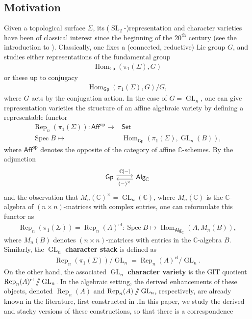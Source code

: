 \documentclass{article}
\numberwithin{equation}{section}
\theoremstyle{quest}
\theoremstyle{definition}
\theoremstyle{remark}
\DeclareMathOperator{\GL}{GL}
\DeclareMathOperator{\Hom}{Hom}
\DeclareMathOperator{\Spec}{Spec}
\DeclareMathOperator{\SL}{SL}
\DeclareMathOperator{\Rep}{Rep}
\newcommand{\git}{\mathbin{
  \mathchoice{/\mkern-6mu/}%
    {/\mkern-6mu/}%
    {/\mkern-5mu/}%
    {/\mkern-5mu/}}}%
\begin{document}
\subsection{Motivation}
Given a topological surface $\Sigma$, its ($\SL_2$-)representation and character varieties have been of classical interest since the beginning of the $20^{\text{th}}$ century (see the introduction to \cite{goldman-char-variety-history}). Classically, one fixes a (connected, reductive) Lie group $G$, and studies either representations of the fundamental group
\begin{align*}
	\Hom_{\mathsf{Gp}}(\pi_1(\Sigma),G)
\end{align*} 
or these up to conjugacy
\begin{align*}
	\Hom_{\mathsf{Gp}}(\pi_1(\Sigma),G) /G,
\end{align*} 
where $G$ acts by the conjugation action. In the case of $G=\GL_n$, one can give representation varieties the structure of an affine algebraic variety by defining a representable functor \cite[Proposition 1.2]{lub}
\begin{align*}
	\Rep_n(\pi_1(\Sigma)): \mathsf{Aff}^{\text{op}}\to &\mathsf{Set}\\
	\Spec B\mapsto &\Hom_{\mathsf{Gp}}(\pi_1(\Sigma),\GL_n(B)),
\end{align*} 
where $\mathsf{Aff}^{\text{op}}$ denotes the opposite of the category of affine $\mathbb{C} $-schemes. By the adjunction
\[
\begin{tikzcd}
\mathsf{Gp}\arrow[r,shift left,"{\mathbb{C}[-]} "]&\mathsf{Alg}_{\mathbb{C} }\arrow[l,shift left, "(-)^\times"]
\end{tikzcd}
\] 
and the observation that $M_n(\mathbb{C} )^\times=\GL_n(\mathbb{C} )$, where $M_n(\mathbb{C} )$ is the $\mathbb{C} $-algebra of $(n\times n)$-matrices with complex entries, one can reformulate this functor as
\begin{align*}
	\Rep_n(\pi_1(\Sigma))=\Rep_n(A)^{\text{cl}}:\Spec B\mapsto \Hom_{\mathsf{Alg}_{\mathbb{C} }}(A,M_n(B )),
\end{align*} 
where $M_n(B)$ denotes $(n\times n)$-matrices with entries in the $\mathbb{C} $-algebra $B$. Similarly, the $\GL_n$ \textbf{character stack} is defined as
\begin{align*}
	\Rep_n(\pi_1(\Sigma)) /\GL_n = \Rep_n(A) ^{\text{cl}}/\GL_n.
\end{align*} 
On the other hand, the associated $\GL_n$ \textbf{character variety} is the GIT quotient $\Rep_n(A)^{\text{cl}}\git \GL_n$. In the algebraic setting, the derived enhancements of these objects, denoted $\Rep_n(A) $ and $\Rep_n(A) \git \GL_n$, respectively, are already known in the literature, first constructed in \cite{BKR}.In this paper, we study the derived and stacky versions of these constructions, so that there is a correspondence
\end{document}
